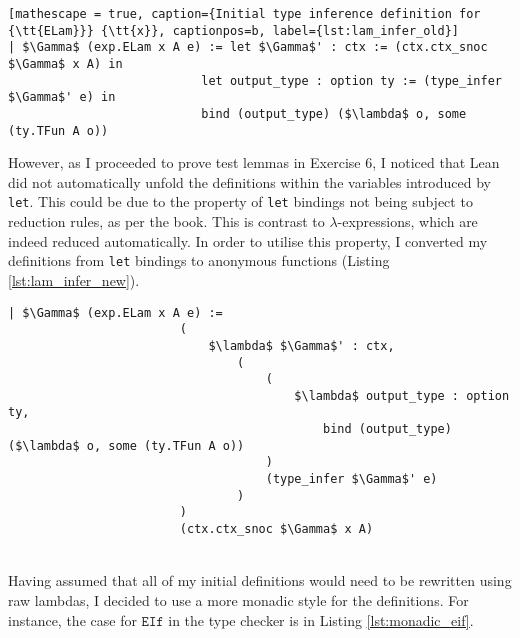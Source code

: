 \documentclass{article}
\newcommand{\tt}[1]{\texttt{#1}}
\begin{document}
\begin{minipage}{\textwidth}
\begin{lstlisting}[mathescape = true, caption={Initial type inference definition for {\tt{ELam}}} {\tt{x}}, captionpos=b, label={lst:lam_infer_old}]
| $\Gamma$ (exp.ELam x A e) := let $\Gamma$' : ctx := (ctx.ctx_snoc $\Gamma$ x A) in
                           let output_type : option ty := (type_infer $\Gamma$' e) in
                           bind (output_type) ($\lambda$ o, some (ty.TFun A o))
\end{lstlisting} 
\end{minipage}

However, as I proceeded to prove test lemmas in Exercise 6, I noticed that Lean did not automatically unfold the definitions within the variables introduced by {\tt{let}}. This could be due to the property of {\tt{let}} bindings not being subject to reduction rules, as per the book. This is contrast to $\lambda$-expressions, which are indeed reduced automatically. In order to utilise this property, I converted my definitions from {\tt{let}} bindings to anonymous functions (Listing \ref{lst:lam_infer_new}). \\

\begin{minipage}{\textwidth}
\begin{lstlisting}[mathescape = true, caption={Updated type inference definition for {\tt{ELam}}.}, captionpos=b, label={lst:lam_infer_new}]
| $\Gamma$ (exp.ELam x A e) := 
                        (
                            $\lambda$ $\Gamma$' : ctx,
                                (
                                    (
                                        $\lambda$ output_type : option ty,
                                            bind (output_type) ($\lambda$ o, some (ty.TFun A o))
                                    )
                                    (type_infer $\Gamma$' e)
                                )
                        )
                        (ctx.ctx_snoc $\Gamma$ x A)
\end{lstlisting}
\end{minipage} \\

Having assumed that all of my initial definitions would need to be rewritten using raw lambdas, I decided to use a more monadic style for the definitions. For instance, the case for ${\tt{EIf}}$ in the type checker is in Listing \ref{lst:monadic_eif}. \\
\end{document}

